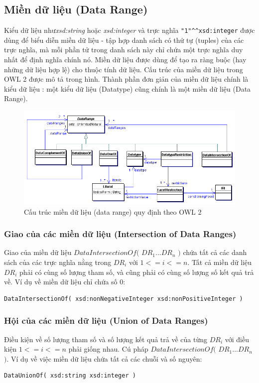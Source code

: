 \subsection{Miền dữ liệu (Data Range)}
Kiểu dữ liệu như\textit{xsd:string} hoặc \textit{xsd:integer} và trực nghĩa \verb|"1"^^xsd:integer| được dùng để biểu diễn miền dữ liệu - tập hợp danh sách có thứ tự (tuples) của các trực nghĩa, mà mỗi phần tử trong danh sách này chỉ chứa một trực nghĩa duy nhất để định nghĩa chính nó. Miền dữ liệu được dùng để tạo ra ràng buộc (hay những dữ liệu hợp lệ) cho thuộc tính dữ liệu. Cấu trúc của miền dữ liệu trong OWL 2 được mô tả trong hình. Thành phần đơn giản của miền dữ liệu chính là kiểu dữ liệu : một kiểu dữ liệu (Datatype) cũng chính là một miền dữ liệu (Data Range).
\begin{figure}[h!]
	\centering
	\includegraphics[width=120mm]{Figures/datarange.png}
	\caption{Cấu trúc miền dữ liệu (data range) quy định theo OWL 2\label{overflow}}
\end{figure}

\subsubsection{Giao của các miền dữ liệu (Intersection of Data Ranges)}
Giao của miền dữ liệu $DataIntersectionOf($ $DR_{1} ... DR_{n}$ $)$  chứa tất cả các danh sách của các trực nghĩa nằng trong $DR_{i}$ với $1 <= i <= n$. Tất cả miền dữ liệu $DR_{i}$ phải có cùng số lượng tham số, và cũng phải có cùng số lượng số kết quả trả về. Ví dụ về miền dữ liệu chỉ chứa số 0:
\begin{verbatim}
DataIntersectionOf( xsd:nonNegativeInteger xsd:nonPositiveInteger )
\end{verbatim}

\subsubsection{Hội của các miền dữ liệu (Union of Data Ranges)}
Điều kiện về số lượng tham số và số lượng kết quả trả về của từng $DR_{i}$ với điều kiện $1 <= i <= n$ phải giống nhau. Cú pháp $DataIntersectionOf($ $DR_{1} ... DR_{n}$ $)$. Ví dụ về việc miền dữ liệu chứa tất cả các chuỗi và số nguyên:
\begin{verbatim}
DataUnionOf( xsd:string xsd:integer )
\end{verbatim}

